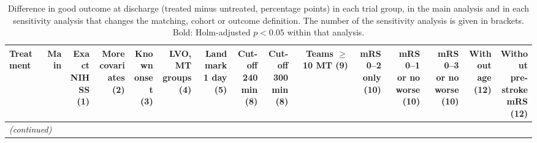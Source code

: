 \clearpage
\begin{landscape}
{\scriptsize
\setlength{\tabcolsep}{3pt}
\begin{longtable}{p{4.9cm}rrrrrrrrrrrrrr}
\caption{Difference in good outcome at discharge (treated minus untreated, percentage points) in each trial group, in the main analysis and in each sensitivity analysis that changes the matching, cohort or outcome definition. The number of the sensitivity analysis is given in brackets. Bold: Holm-adjusted $p < 0.05$ within that analysis.}\label{tab:supp_sens_all_good}\\
\toprule
Treatment & Main & \makecell{Exact\\NIHSS\\(1)} & \makecell{More\\covariates\\(2)} & \makecell{Known\\onset\\(3)} & \makecell{LVO,\\MT groups\\(4)} & \makecell{Landmark\\1 day\\(5)} & \makecell{Cut-off\\240 min\\(8)} & \makecell{Cut-off\\300 min\\(8)} & \makecell{Teams\\$\ge$10 MT\\(9)} & \makecell{mRS 0--2\\only\\(10)} & \makecell{mRS 0--1\\or no worse\\(10)} & \makecell{mRS 0--3\\or no worse\\(10)} & \makecell{Without\\age\\(12)} & \makecell{Without\\pre-stroke\\mRS (12)} \\
\midrule
\endfirsthead
\multicolumn{15}{l}{\textit{(continued)}}\\
\toprule

\end{longtable}}
\end{landscape}
